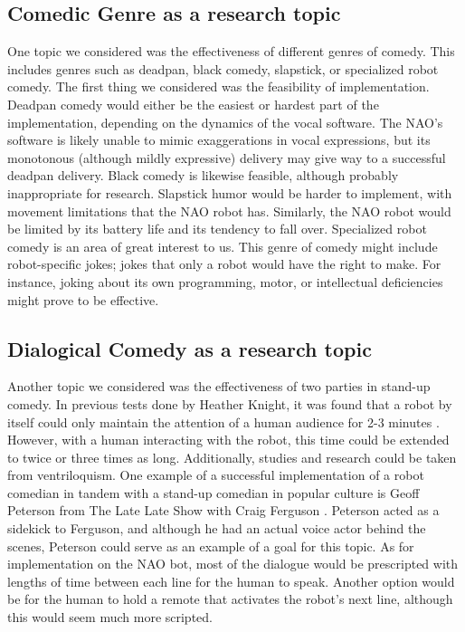 \documentclass[onecolumn, draftclsnofoot,10pt, compsoc]{IEEEtran}
\begin{document}
\subsection{Comedic Genre as a research topic}
One topic we considered was the effectiveness of different genres of comedy.
This includes genres such as deadpan, black comedy, slapstick, or specialized robot comedy.
The first thing we considered was the feasibility of implementation.
Deadpan comedy would either be the easiest or hardest part of the implementation, depending on the dynamics of the vocal software.
The NAO's software is likely unable to mimic exaggerations in vocal expressions, but its monotonous (although mildly expressive) delivery may give way to a successful deadpan delivery.
Black comedy is likewise feasible, although probably inappropriate for research.
Slapstick humor would be harder to implement, with movement limitations that the NAO robot has.
Similarly, the NAO robot would be limited by its battery life and its tendency to fall over.
Specialized robot comedy is an area of great interest to us.
This genre of comedy might include robot-specific jokes; jokes that only a robot would have the right to make.
For instance, joking about its own programming, motor, or intellectual deficiencies might prove to be effective.


\subsection{Dialogical Comedy as a research topic}
Another topic we considered was the effectiveness of two parties in stand-up comedy.
In previous tests done by Heather Knight, it was found that a robot by itself could only maintain the attention of a human audience for 2-3 minutes \cite{OneNote:Anish}.
However, with a human interacting with the robot, this time could be extended to twice or three times as long.
Additionally, studies and research could be taken from ventriloquism.
One example of a successful implementation of a robot comedian in tandem with a stand-up comedian in popular culture is Geoff Peterson from The Late Late Show with Craig Ferguson \cite{GeoffPeterson}.
Peterson acted as a sidekick to Ferguson, and although he had an actual voice actor behind the scenes, Peterson could serve as an example of a goal for this topic.
As for implementation on the NAO bot, most of the dialogue would be prescripted with lengths of time between each line for the human to speak.
Another option would be for the human to hold a remote that activates the robot's next line, although this would seem much more scripted.
\end{document}
